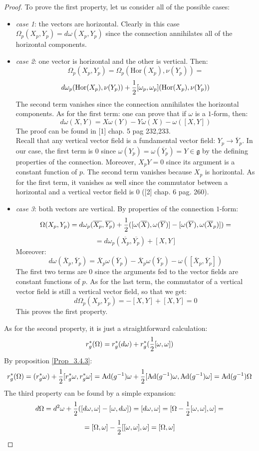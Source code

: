 \documentclass[12pt,a4paper]{report}
\theoremstyle{definition}
\theoremstyle{Theorem}
\theoremstyle{definition}
\theoremstyle{definition}
\begin{document}
	\begin{proof}
		To prove the first property, let us consider all of the possible cases:
		\begin{itemize}
			\item \textit{case 1}: the vectors are horizontal. Clearly in this case $\Omega_p(X_p,Y_p)=d\omega(X_p,Y_p)$ since the connection annihilates all of the horizontal components.
			\item \textit{case 2}: one vector is horizontal and the other is vertical. Then:
			$$\Omega_p(X_p,Y_p)=\Omega_p(\mathrm{Hor}(X_p),\nu(Y_p))=$$
			$$d\omega_p(\mathrm{Hor}(X_p),\nu(Y_p))+{1\over 2}[\omega_p,\omega_p](\mathrm{Hor}(X_p),\nu(Y_p))$$
			The second term vanishes since the connection annihilates the horizontal components. As for the first term: one can prove that if $\omega$ is a $1$-form, then:
			$$d\omega(X,Y)=X\omega(Y)-Y\omega(X)-\omega([X,Y])$$
			The proof can be found in [1] chap. 5 pag 232,233.\\
			Recall that any vertical vector field is a fundamental vector field: $Y_p\rightarrow \overline{Y}_p$. In our case, the first term is 0 since $\omega(Y_p)=\omega(\overline{Y}_p)=Y\in\mathfrak{g}$ by the defining properties of the connection. Moreover, $X_pY=0$ since its argument is a constant function of $p$. The second term vanishes because $X_p$ is horizontal. As for the first term, it vanishes as well since the commutator between a horizontal and a vertical vector field is 0 ([2] chap. 6 pag. 260).
			\item\textit{case 3}: both vectors are vertical. By properties of the connection $1$-form:
			$$\Omega(X_p,Y_p)=d\omega_p(\overline{X_p},\overline{Y_p})+{1\over 2} ([\omega(\overline{X}),\omega(\overline{Y})]-[\omega(\overline{Y}),\omega(\overline{X}_p)])=$$
			$$=d\omega_p(\overline{X_p},\overline{Y_p})+[X,Y]$$
			Moreover:
			$$d\omega(\overline{X}_p,\overline{Y}_p)=\overline{X}_p\omega(\overline{Y}_p)-\overline{X}_p\omega(\overline{Y}_p)-\omega([\overline{X}_p,\overline{Y}_p])$$	
			The first two terms are 0 since the arguments fed to the vector fields are constant functions of $p$. As for the last term, the commutator of a vertical vector field is still a vertical vector field, so that we get:
			$$d\Omega_p(X_p,Y_p)=-[X,Y]+[X,Y]=0$$
			This proves the first property.
		\end{itemize}
		As for the second property, it is just a straightforward calculation:
		$$r^*_g(\Omega)=r^*_g(d\omega)+r^*_g({1\over 2}[\omega,\omega])$$
		By proposition \ref{Prop_3.4.3}:
		$$r^*_g(\Omega)=(r^*_g\omega)+{1\over 2}[r^*_g\omega,r^*_g\omega]=\hbox{Ad}(g^{-1})\omega+{1\over 2}[\hbox{Ad}(g^{-1})\omega,\hbox{Ad}(g^{-1})\omega]=\hbox{Ad}(g^{-1})\Omega$$
		The third property can be found by a simple expansion:
		$$d\Omega=d^2\omega+{1\over 2}([d\omega,\omega]-[\omega,d\omega])=[d\omega,\omega]=[\Omega-{1\over 2}[\omega,\omega],\omega]=$$
		$$=[\Omega,\omega]-{1\over 2}[[\omega,\omega],\omega]=[\Omega,\omega]$$
	\end{proof}
\end{document}
